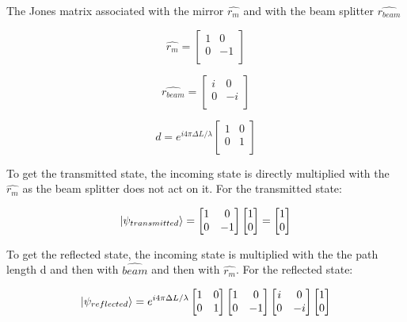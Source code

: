 \documentclass{article}
\begin{document}
The Jones matrix associated with the mirror $\hat {r_m}$ and with the beam splitter $\hat {r_{beam}}$

\[\hat{r_m} = \begin{bmatrix}
1&0\\
0&-1\\
\end{bmatrix}
\]

\[\hat{r_{beam}} = \begin{bmatrix}
i&0\\
0&-i\\
\end{bmatrix}
\]

\[d = e^{i4\pi\Delta{L}/\lambda}\begin{bmatrix}
1&0\\
0&1\\
\end{bmatrix}\]

To get the transmitted state, the incoming state is directly multiplied with the $\hat{r_m}$ as the beam splitter does not act on it. For the transmitted state: 

\[\ket{\psi_{transmitted}} = \begin{bmatrix}
1&0\\
0&-1\\
\end{bmatrix}
\begin{bmatrix}
1\\
0\\
\end{bmatrix}
=
\begin{bmatrix}
1\\
0\\
\end{bmatrix}
\]

To get the reflected state, the incoming state is multiplied with the the path length d and then with $\hat{beam}$ and then with $\hat{r_m}$. For the reflected state: 


\[\ket{\psi_{reflected}} = e^{i4\pi\Delta{L}/\lambda}\begin{bmatrix}
1&0\\
0&1\\
\end{bmatrix}
\begin{bmatrix}
1&0\\
0&-1\\
\end{bmatrix}
\begin{bmatrix}
i&0\\
0&-i\\
\end{bmatrix}
\begin{bmatrix}
1\\
0\\
\end{bmatrix}
\]
\end{document}
